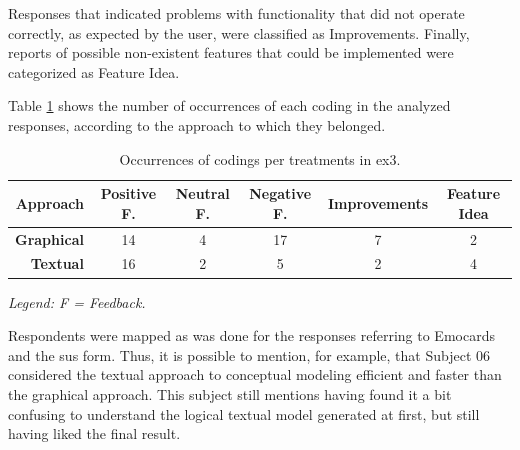 Responses that indicated problems with functionality that did not operate correctly, as expected by the user, were classified as Improvements.
Finally, reports of possible non-existent features that could be implemented were categorized as Feature Idea.

Table \ref{tab:QAnubis} shows the number of occurrences of each coding in the analyzed responses, according to the approach to which they belonged.

\begin{table}[!htb]
 \caption{Occurrences of codings per treatments in \ac{ex3}.}
    \label{tab:QAnubis}
\scriptsize
\centering
\begin{tabular}{rccccc}
\bottomrule
\rowcolor[HTML]{C0C0C0}
\textbf{Approach} & \textbf{Positive F.} & \textbf{Neutral F.} & \textbf{Negative F.} & \textbf{Improvements} & \textbf{Feature Idea} \\ \hline
\textbf{Graphical} & 14 & 4 & 17 & 7 & 2 \\
\textbf{Textual} & 16 & 2 & 5 & 2 & 4 \\ \toprule
\end{tabular}
\begin{tablenotes}
    \scriptsize
    \centering
    \item \textit{Legend: F = Feedback.}
\end{tablenotes}
\end{table}

Respondents were mapped as was done for the responses referring to Emocards and the \ac{sus} form.
Thus, it is possible to mention, for example, that Subject 06 considered the textual approach to conceptual modeling efficient and faster than the graphical approach.
This subject still mentions having found it a bit confusing to understand the logical textual model generated at first, but still having liked the final result.

